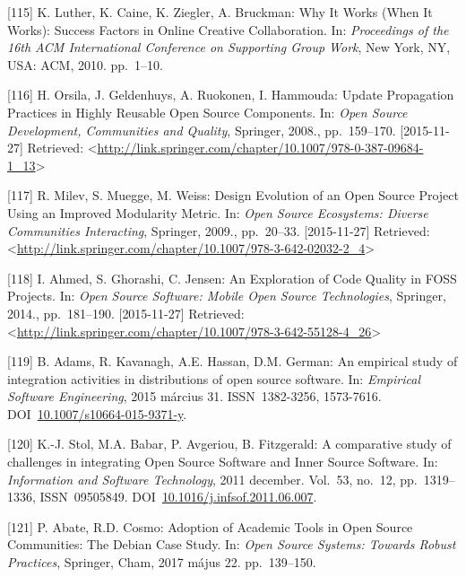 \documentclass[12pt,magyar,a4paper,oneside]{scrreprt}
\newenvironment{cslreferences}%
  {}%
  {\par}
\begin{document}
\begin{cslreferences}
\leavevmode\hypertarget{ref-luther_why_2010}{}%
{[}115{]} K. Luther, K. Caine, K. Ziegler, A. Bruckman: Why It Works
(When It Works): Success Factors in Online Creative Collaboration. In:
\emph{Proceedings of the 16th ACM International Conference on Supporting
Group Work}, New York, NY, USA: ACM, 2010. pp.~1--10.

\leavevmode\hypertarget{ref-orsila_update_2008}{}%
{[}116{]} H. Orsila, J. Geldenhuys, A. Ruokonen, I. Hammouda: Update
Propagation Practices in Highly Reusable Open Source Components. In:
\emph{Open Source Development, Communities and Quality}, Springer,
2008., pp.~159--170. {[}2015-11-27{]} Retrieved:
\textless{}\url{http://link.springer.com/chapter/10.1007/978-0-387-09684-1_13}\textgreater{}

\leavevmode\hypertarget{ref-milev_design_2009}{}%
{[}117{]} R. Milev, S. Muegge, M. Weiss: Design Evolution of an Open
Source Project Using an Improved Modularity Metric. In: \emph{Open
Source Ecosystems: Diverse Communities Interacting}, Springer, 2009.,
pp.~20--33. {[}2015-11-27{]} Retrieved:
\textless{}\url{http://link.springer.com/chapter/10.1007/978-3-642-02032-2_4}\textgreater{}

\leavevmode\hypertarget{ref-ahmed_exploration_2014}{}%
{[}118{]} I. Ahmed, S. Ghorashi, C. Jensen: An Exploration of Code
Quality in FOSS Projects. In: \emph{Open Source Software: Mobile Open
Source Technologies}, Springer, 2014., pp.~181--190. {[}2015-11-27{]}
Retrieved:
\textless{}\url{http://link.springer.com/chapter/10.1007/978-3-642-55128-4_26}\textgreater{}

\leavevmode\hypertarget{ref-adams_empirical_2015}{}%
{[}119{]} B. Adams, R. Kavanagh, A.E. Hassan, D.M. German: An empirical
study of integration activities in distributions of open source
software. In: \emph{Empirical Software Engineering}, 2015 március 31.
ISSN~1382-3256, 1573-7616.
DOI~\href{https://doi.org/10.1007/s10664-015-9371-y}{10.1007/s10664-015-9371-y}.

\leavevmode\hypertarget{ref-stol_comparative_2011}{}%
{[}120{]} K.-J. Stol, M.A. Babar, P. Avgeriou, B. Fitzgerald: A
comparative study of challenges in integrating Open Source Software and
Inner Source Software. In: \emph{Information and Software Technology},
2011 december. Vol.~53, no.~12, pp.~1319--1336, ISSN~09505849.
DOI~\href{https://doi.org/10.1016/j.infsof.2011.06.007}{10.1016/j.infsof.2011.06.007}.

\leavevmode\hypertarget{ref-abate_adoption_2017}{}%
{[}121{]} P. Abate, R.D. Cosmo: Adoption of Academic Tools in Open
Source Communities: The Debian Case Study. In: \emph{Open Source
Systems: Towards Robust Practices}, Springer, Cham, 2017 május 22.
pp.~139--150.


\end{cslreferences}
\end{document}
